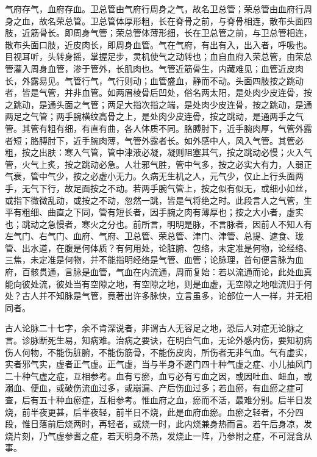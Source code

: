 \documentclass[a4paper,12pt,UTF8,twoside]{ctexbook}
\begin{document}
	气府存气，血府存血。卫总管由气府行周身之气，故名卫总管；荣总管由血府行周身之血，故名荣总管。卫总管体厚形粗，长在脊骨之前，与脊骨相连，散布头面四肢，近筋骨长。即周身气管；荣总管体薄形细，长在卫总管之前，与卫总管相连，散布头面口肢，近皮肉长，即周身血管。气在气府，有出有入，出入者，呼吸也。目视耳听，头转身摇，掌握足步，灵机使气之动转也；血自血府入荣总管，由荣总管灌入周身血管，渗于管外，长肌肉也。气管近筋骨生，内藏难见；血管近皮肉长，外露易见。气管行气，气行则动；血管盛血，静而不动。头面四肢按之跳动者，皆是气管，并非血管。如两眉棱骨后凹处，俗名两太阳，是处肉少皮连骨，按之跳动，是通头面之气管；两足大指次指之端，是处肉少皮连骨，按之跳动，是通两足之气管；两手腕横纹高骨之上，是处肉少皮连骨，按之跳动，是通两手之气管。其管有粗有细，有直有曲，各人体质不同。胳膊肘下，近手腕肉厚，气管外露者短；胳膊肘下，近手腕肉薄，气管外露者长。如外感中人，风入气管。其管必粗，按之出肤：寒入气管，管中津液必凝，凝则阻塞其气，按之跳动必慢；火入气管，火气上炙，按之跳动必急。人壮邪气胜，管中气多，按之必实大有力，人弱正气衰，管中气少，按之必虚小无力。久病无生机之人，元气少，仅止上行头面两手，无气下行，故足面按之不动。若两手腕气管上，按之似有似无，或细小如丝，或指下微微乱动，或按之不动，忽然一跳，皆是气将绝之时。此段言人之气管，生平有粗细、曲直之下同，管有短长者，因手腕之肉有薄厚也；按之大小者，虚实也；跳动之急慢者，寒火之分也。前所言，明明是脉，不言脉者，因前人不知人有左气门、右气门、血府、气府、卫总管、荣总管、津门、津管、总提、遮食、珑管、出水道，在腹是何体质？有何用处，论脏腑、包络，未定准是何物，论经络、三焦，未定准是何物，并不能指明经络是气管、血管；论脉理，首句便言脉为血府，百骸贯通，言脉是血管，气血在内流通，周而复始：若以流通而论，此处血真能向彼处流，彼处当有空隙之地，有空隙之地，则是血虚，无空隙之地咄流归于何处？古人并不知脉是气管，竟著出许多脉快，立言虽多，论部位一人一样，并无相同者。
	
	古人论脉二十七字，余不肯深说者，非谓古人无容足之地，恐后人对症无论脉之言。诊脉断死生易，知病难。治病之要诀，在明白气血，无论外感内伤，要知初病伤人何物，不能伤脏腑，不能伤筋骨，不能伤皮肉，所伤者无非气血。气有虚实，实者邪气实，虚者正气虚。正气虚，当与半身不遂门四十种气虚之症、小儿抽风门二十种气虚之症，互相参考。血有亏瘀，血亏必有亏血之因，或因吐血、衄血，或溺血、便血，或破伤流血过多，或崩漏、产后伤血过多；若血瘀，有血瘀之症可查，后有五十种血瘀症，互相参考。惟血府之血，瘀而不活，最难分别。后半日发烧，前半夜更甚，后半夜轻，前半日不烧，此是血府血瘀。血瘀之轻者，不分四段，惟日落前后烧两时，再轻者，或烧一时，此内烧兼身热而言。若午后身凉，发烧片刻，乃气虚参耆之症，若天明身不热，发烧止一阵，乃参附之症，不可混含从事。
	
\end{document}
